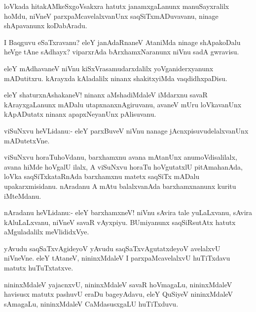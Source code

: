 \documentclass{article}
\begin{document}
\begin{mn}
loVkada hitakAMkeSxgoVsakxra hatutx janamxgaLanunx manuSayxralilx
hoMdu, niVneV parxpaMcavelalxvanUnx saqSiTxmADuvavanu, ninage
shApavanunx koDabAradu.
\end{mn}

\begin{mn}%
I Baqguvu eSaTxravanu? eleY janAdaRnaneV AtaniMda ninage shApakoDalu
heVge tAne sAdhayx? viparxrAda bArxhamxNaranunx niVnu sadA gwravisu.
\end{mn}

\begin{mn}%
eleY mAdhavaneV niVnu kiSxVrasamudarxdalilx yoVganiderxyanunx
mADutitxru. kArayxda kAladalilx ninanx shakitxyiMda vaqdidhxpaDisu.
\end{mn}

\begin{mn}%
eleY shaturxnAshakaneV! ninanx aMshadiMdaleV iMdarxnu savaR
kArayxgaLanunx mADalu utapxnanxnAgiruvanu, avaneV mUru loVkavanUnx
kApADutatx ninanx apapxNeyanUnx pAlisuvanu.
\end{mn}

\begin{mn}%
viSuNxvu heVLidanu:- eleY parxBuveV niVnu nanage
jAcnxpisuvudelalxvanUnx mADutetxVne.
\end{mn}

\begin{mn}%
viSuNxvu horaTuhoVdanu, barxhamxnu avana mAtanUnx anumoVdisalilalx,
avana hiMde hoVgalU ilalx, A viSuNxvu horaTu hoVgutatxlU pitAmahanAda,
loVka saqSiTxkataRnAda barxhamxnu matetx saqSiTx mADalu
upakarxmisidanu. nAradanu A mAtu balalxvanAda barxhamxnanunx kuritu iMteMdanu.
\end{mn}

\begin{mn}%
nAradanu heVLidanu:- eleY barxhamxneV! niVnu sAvira tale yuLaLxvanu,
sAvira kAluLaLxvanu, niVneV savaR vAyxpiyu. BUmiyanunx saqSiRsutAtx
hatutx aMguladalilx meVlididxVye.
\end{mn}

\begin{mn}
yAvudu saqSaTxvAgideyoV yAvudu saqSaTxvAgutatxdeyoV avelalxvU
niVneVne. eleY tAtaneV, nininxMdaleV I parxpaMcavelalxvU huTiTxdavu
matutx huTuTxtatxve.
\end{mn}

\begin{mn}%
nininxMdaleV yajacnxvU, nininxMdaleV savaR hoVmagaLu, nininxMdaleV
havisusx matutx pashuvU eraDu bageyAdavu, eleY QuSiyeV nininxMdaleV
sAmagaLu, nininxMdaleV CaMdasusxgaLU huTiTxduvu.
\end{mn}
\end{document}
